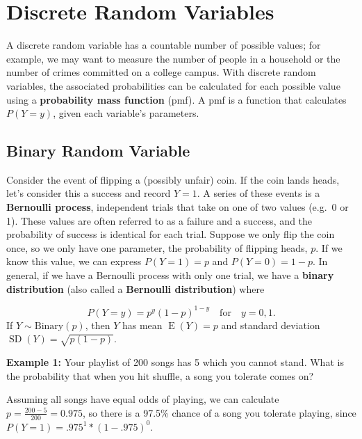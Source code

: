 \documentclass[
]{krantz}
\newcommand{\E}{\operatorname{E}}
\newcommand{\SD}{\operatorname{SD}}
\begin{document}
\hypertarget{discrete-random-variables}{%
\section{Discrete Random Variables}\label{discrete-random-variables}}

A discrete random variable has a countable number of possible values; for example, we may want to measure the number of people in a household or the number of crimes committed on a college campus. With discrete random variables, the associated probabilities can be calculated for each possible value using a \textbf{probability mass function} (pmf).  A pmf is a function that calculates \(P(Y=y)\), given each variable's parameters.

\hypertarget{sec-binary}{%
\subsection{Binary Random Variable}\label{sec-binary}}

Consider the event of flipping a (possibly unfair) coin. If the coin lands heads, let's consider this a success and record \(Y = 1\).
A series of these events is a \textbf{Bernoulli process},  independent trials that take on one of two values (e.g.~0 or 1). These values are often referred to as a failure and a success, and the probability of success is identical for each trial.
Suppose we only flip the coin once, so we only have one parameter, the probability of flipping heads, \(p\). If we know this value, we can express \(P(Y=1) = p\) and \(P(Y=0) = 1-p\). In general, if we have a Bernoulli process with only one trial, we have a \textbf{binary distribution} (also called a \textbf{Bernoulli distribution})  where

\begin{equation} 
P(Y = y) = p^y(1-p)^{1-y} \quad \textrm{for} \quad y = 0, 1.
\label{eq:binaryRV}
\end{equation}
If \(Y \sim \textrm{Binary}(p)\), then \(Y\) has mean \(\E(Y) = p\) and standard deviation \(\SD(Y) = \sqrt{p(1-p)}\).

\textbf{Example 1:} Your playlist of 200 songs has 5 which you cannot stand. What is the probability that when you hit shuffle, a song you tolerate comes on?

Assuming all songs have equal odds of playing, we can calculate \(p = \frac{200-5}{200} = 0.975\), so there is a 97.5\% chance of a song you tolerate playing, since \(P(Y=1)=.975^1*(1-.975)^0\).
\end{document}
